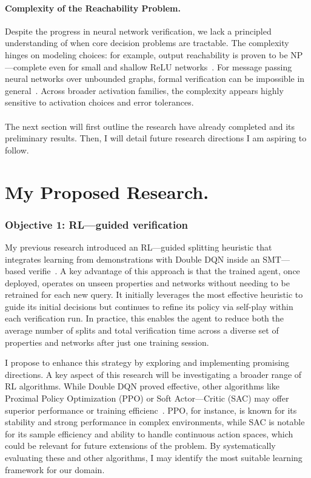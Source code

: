 \documentclass{llncs}
\begin{document}
\paragraph{Complexity of the Reachability Problem.}
Despite the progress in neural network verification, we lack a principled understanding of when core decision problems are tractable. 
The complexity hinges on modeling choices: for example, output reachability is proven to be 
NP---complete even for small and shallow ReLU networks~\cite{SaLa21}.
For message passing neural networks over unbounded graphs, formal verification can be impossible in general~\cite{SaLa23}. 
Across broader activation families, the complexity appears highly sensitive to activation choices and error tolerances.

\paragraph{}
The next section will first outline the research have already completed and its preliminary results. 
Then, I will detail future research directions I am aspiring to follow.

\section{My Proposed Research.}
\subsubsection{Objective 1: RL---guided verification}
My previous research introduced an RL---guided splitting heuristic that integrates learning 
from demonstrations with Double DQN inside an SMT---based verifie~\cite{Katz2019Marabou,KBD17,vanHasselt2016DoubleDQN,hester2018dqfd}.
A key advantage of this approach is that the trained agent, once deployed, operates on unseen 
properties and networks without needing to be retrained for each new query. It initially leverages 
the most effective heuristic to guide its initial decisions but continues to refine its policy via 
self-play within each verification run. In practice, this enables the agent to reduce both the average 
number of splits and total verification time across a diverse set of properties 
and networks after just one training session.

I propose to enhance this strategy by exploring and implementing promising directions. 
A key aspect of this research will be investigating a broader range of RL algorithms. 
While Double DQN proved effective, other algorithms like Proximal Policy Optimization (PPO) or 
Soft Actor---Critic (SAC) may offer superior performance or training efficienc~\cite{Schulman2017PPO,Haarnoja2018SAC}. 
PPO, for instance, is known for its stability and strong performance in complex environments, 
while SAC is notable for its sample efficiency and ability to handle continuous action spaces, 
which could be relevant for future extensions of the problem. By systematically evaluating these 
and other algorithms, I may identify the most suitable learning framework for our domain.
\end{document}
